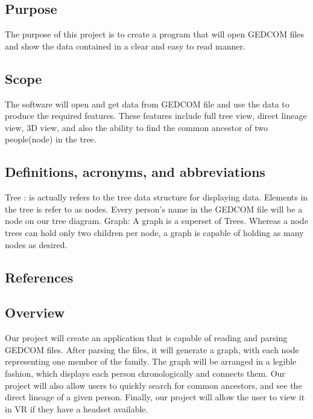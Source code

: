 \documentclass[onecolumn, draftclsnofoot, 10pt, compsoc]{IEEEtran}
\begin{document}
\subsection{Purpose}
\begin{singlespace}
The purpose of this project is to create a program that will open GEDCOM files and show the data contained in a clear and easy to read manner.
\end{singlespace}

\subsection{Scope}
\begin{singlespace}
The software will open and get data from GEDCOM file and use the data to produce the required features. These features include full tree view, direct lineage view, 3D view, and also the ability to find the common ancestor of two people(node) in the tree. 
\end{singlespace}

\subsection{Definitions, acronyms, and abbreviations}
\begin{singlespace}
Tree : is actually refers to the tree data structure for displaying data. Elements in the tree is refer to as nodes. Every person’s name in the GEDCOM file will be a node on our tree diagram.
\newline
\newline
Graph: A graph is a superset of Trees. Whereas a node trees can hold only two children per node, a graph is capable of holding as many nodes as desired.
\end{singlespace}

\subsection{References}
\begin{singlespace}

\end{singlespace}

\subsection{Overview}
\begin{singlespace}
 Our project will create an application that is capable of reading and parsing GEDCOM files. After parsing the files, it will generate a graph, with each node representing one member of the family. The graph will be arranged in a legible fashion, which displays each person chronologically and connects them. Our project will also allow users to quickly search for common ancestors, and see the direct lineage of a given person. Finally, our project will allow the user to view it in VR if they have a headset available.
\end{singlespace}
\end{document}
